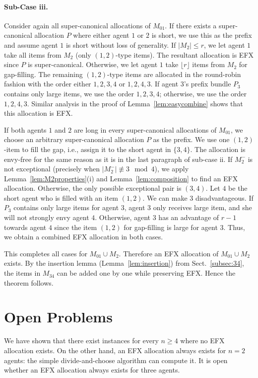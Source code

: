 \documentclass{article}
\theoremstyle{definition}
\begin{document}
\paragraph{Sub-Case iii.}
Consider again all super-canonical allocations of $M_{01}$.
If there exists a super-canonical allocation $P$ where either agent $1$ or $2$ is short, we use this as the prefix and assume agent $1$ is short without loss of generality.
If $|M_2|\leq r$, we let agent $1$ take all items from $M_2$ (only $(1,2)$-type items).
The resultant allocation is EFX since $P$ is super-canonical.
Otherwise, we let agent $1$ take $\lfloor r\rfloor$ items from $M_2$ for gap-filling.
The remaining $(1,2)$-type items are allocated in the round-robin fashion with the order either $1,2,3,4$ or $1,2,4,3$.
If agent $3$'s prefix bundle $P_3$ contains only large items, we use the order $1,2,3,4$; otherwise, we use the order $1,2,4,3$.
Similar analysis in the proof of Lemma~\ref{lem:easycombine} shows that this allocation is EFX.

If both agents $1$ and $2$ are long in every super-canonical allocations of $M_{01}$, we choose an arbitrary super-canonical allocation $P$ as the prefix.
We use one $(1,2)$-item to fill the gap, i.e., assign it to the short agent in $\{3,4\}$.
The allocation is envy-free for the same reason as it is in the last paragraph of sub-case ii.
If $M_2^-$ is not exceptional (precisely when $|M_2^-|\not\equiv3\mod 4$), we apply Lemma~\ref{lem:M2properties}(i) and Lemma~\ref{lem:composition} to find an EFX allocation.
Otherwise, the only possible exceptional pair is $(3,4)$.
Let $4$ be the short agent who is filled with an item $(1,2)$.
We can make $3$ disadvantageous.
If $P_3$ contains only large items for agent $3$, agent $3$ only receives large item, and she will not strongly envy agent $4$.
Otherwise, agent $3$ has an advantage of $r-1$ towards agent $4$ since the item $(1,2)$ for gap-filling is large for agent $3$.
Thus, we obtain a combined EFX allocation in both cases.


This completes all cases for $M_{01}\cup M_2$.  Therefore an EFX allocation
of $M_{01}\cup M_2$ exists.  By the insertion lemma (Lemma~\ref{lem:insertion}) from Sect.~\ref{subsec:34}, the items
in $M_{34}$ can be added one by one while preserving EFX.  Hence the theorem
follows.


\section{Open Problems}
We have shown that there exist instances for every $n\geq4$ where no EFX allocation exists.
On the other hand, an EFX allocation always exists for $n=2$ agents: the simple divide-and-choose algorithm can compute it.
It is open whether an EFX allocation always exists for three agents.
\end{document}
